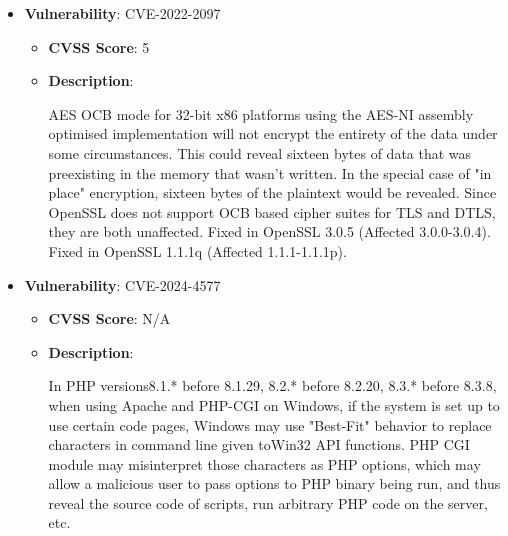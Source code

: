 \documentclass{article}
\begin{document}
\begin{itemize}
        \item \textbf{Vulnerability}: CVE-2022-2097
        \begin{itemize}
            \item \textbf{CVSS Score}:  5 
            \item \textbf{Description}:
            \parbox[t]{0.9\linewidth}{
                \ttfamily AES OCB mode for 32-bit x86 platforms using the AES-NI assembly optimised implementation will not encrypt the entirety of the data under some circumstances. This could reveal sixteen bytes of data that was preexisting in the memory that wasn't written. In the special case of "in place" encryption, sixteen bytes of the plaintext would be revealed. Since OpenSSL does not support OCB based cipher suites for TLS and DTLS, they are both unaffected. Fixed in OpenSSL 3.0.5 (Affected 3.0.0-3.0.4). Fixed in OpenSSL 1.1.1q (Affected 1.1.1-1.1.1p).
            }
        \end{itemize}
    
        \item \textbf{Vulnerability}: CVE-2024-4577
        \begin{itemize}
            \item \textbf{CVSS Score}:  N/A 
            \item \textbf{Description}:
            \parbox[t]{0.9\linewidth}{
                \ttfamily In PHP versions8.1.* before 8.1.29, 8.2.* before 8.2.20, 8.3.* before 8.3.8, when using Apache and PHP-CGI on Windows, if the system is set up to use certain code pages, Windows may use "Best-Fit" behavior to replace characters in command line given toWin32 API functions. PHP CGI module may misinterpret those characters as PHP options, which may allow a malicious user to pass options to PHP binary being run, and thus reveal the source code of scripts, run arbitrary PHP code on the server, etc.
            }
        \end{itemize}
    

\end{itemize}
\end{document}
